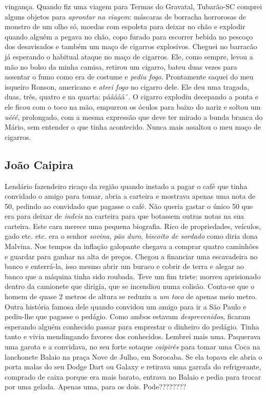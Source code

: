 \documentclass[12pt,brazil,]{book}
\begin{document}
vingança. Quando fiz uma viagem para Termas do Gravatal, Tubarão-SC
comprei alguns objetos para \emph{aprontar na viagem}: máscaras de
borracha horrorosas de monstro de um olho só, moedas com espoleta para
deixar no chão e explodir quando alguém a pegava no chão, copo furado
para escorrer bebida no pescoço dos desavisados e também um maço de
cigarros explosivos. Cheguei no barracão já esperando o habitual ataque
no maço de cigarros. Ele, como sempre, levou a mão no bolso da minha
camisa, retirou um cigarro, bateu duas vezes para assentar o fumo como
era de costume e \emph{pediu fogo}. Prontamente saquei do meu isqueiro
Ronson, americano e \emph{ateei fogo} no cigarro dele. Ele deu uma
tragada, duas, três, quatro e na quarta: pááááá´. O cigarro explodiu
decepando a ponta e ele ficou com o toco na mão, empurrou os óculos para
baixo do nariz e soltou um \emph{uééé}, prolongado, com a mesma
expressão que deve ter mirado a bunda branca do Mário, sem entender o
que tinha acontecido. Nunca mais assaltou o meu maço de cigarros.

\subsection{João Caipira}\label{jouxe3o-caipira}

Lendário fazendeiro ricaço da região quando instado a pagar o café que
tinha convidado o amigo para tomar, abria a carteira e mostrava apenas
uma nota de 50, pedindo ao convidado que pagasse o café. Não queria
gastar o único 50 que era para deixar de \emph{indeis} na carteira para
que botassem outras notas na sua carteira. Este cara merece uma pequena
biografia. Rico de propriedades, veículos, gado etc. etc. era o senhor
\emph{sovina}, \emph{pão duro}, \emph{biscoito de sordado} como diria
dona Malvina. Nos tempos da inflação galopante chegava a comprar quatro
caminhões e guardar para ganhar na alta de preços. Chegou a financiar
uma escavadeira no banco e enterrá-la, isso mesmo abrir um buraco e
cobrir de terra e alegar ao banco que a máquina tinha sido roubada. Teve
um fim triste: morreu aprisionado dentro da camionete que dirigia, que
se incendiou numa colisão. Conta-se que o homem de quase 2 metros de
altura se reduziu a \emph{um toco} de apenas meio metro. Outra história
famosa dele quando convidou um amigo para ir a São Paulo e pediu-lhe que
pagasse o pedágio. Como ambos estavam \emph{desprevenidos}, ficaram
esperando alguém conhecido passar para emprestar o dinheiro do pedágio.
Tinha tanto e vivia mendingando favores dos conhecidos. Lembrei mais
uma. Paquerava uma garota e a convidava, no seu forte sotaque
\emph{caipirês} para tomar uma Coca na lanchonete Balaio na praça Nove
de Julho, em Sorocaba. Se ela topava ele abria o porta malas do seu
Dodge Dart ou Galaxy e retirava uma garrafa do refrigerante, comprado de
caixa porque era mais barato, entrava no Balaio e pedia para trocar por
uma gelada. Apenas uma, para os dois. Pode????????
\end{document}
